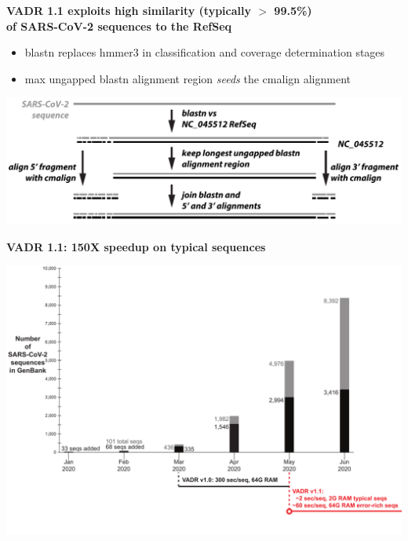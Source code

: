 \documentclass[landscape]{slides}
\begin{document}
\begin{slide}
\begin{center}
\large{\textbf{VADR 1.1 exploits high similarity (typically $>$ 99.5\%) \\ of SARS-CoV-2 sequences to the RefSeq}}
\end{center}

\begin{itemize}
  \item blastn replaces hmmer3 in classification and coverage determination stages
  \item max ungapped blastn alignment region \emph{seeds} the cmalign alignment
\end{itemize}

\begin{center}
\includegraphics[width=10.5in]{figs/vadr-s-option}
\end{center}

\vfill
\end{slide}
\begin{slide}
\begin{center}
\large{\textbf{VADR 1.1: 150X speedup on typical sequences}}

\includegraphics[width=10.5in]{figs/sars-counts-jan2020-may2020-slide3}
\end{center}

\vfill
\end{slide}
\end{document}
